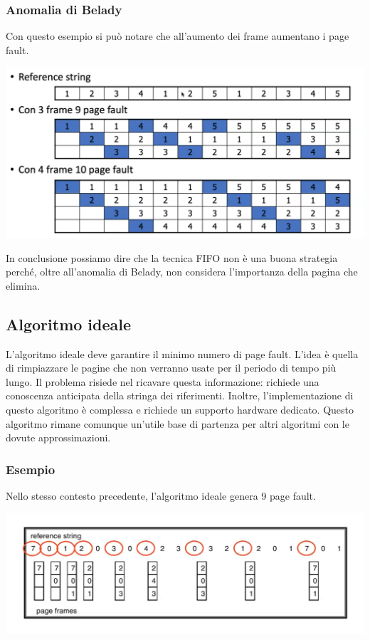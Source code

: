 \documentclass[a4paper,12pt, twoside]{report}
\begin{document}
\subsubsection{Anomalia di Belady}
Con questo esempio si pu\`o notare che all'aumento dei frame aumentano i page fault. 
\begin{center}
    \includegraphics[scale=0.15]{belady_example}
\end{center} 

In conclusione possiamo dire che la tecnica FIFO non \`e una buona strategia perch\'e, oltre all'anomalia di Belady, non considera l'importanza della 
pagina che elimina. 

\subsection{Algoritmo ideale}

L'algoritmo ideale deve garantire il minimo numero di page fault. L'idea \`e quella di rimpiazzare le pagine che non 
verranno usate per il periodo di tempo pi\`u lungo. Il problema risiede nel ricavare questa informazione: richiede una 
conoscenza anticipata della stringa dei riferimenti. Inoltre, l'implementazione di questo algoritmo \`e complessa e 
richiede un supporto hardware dedicato. 
Questo algoritmo rimane comunque un'utile base di partenza per altri algoritmi con le dovute approssimazioni. 

\subsubsection{Esempio} 
Nello stesso contesto precedente, l'algoritmo ideale genera 9 page fault. 
\begin{center}
    \includegraphics[scale=0.15]{ideal_alg}
\end{center} 
\end{document}
